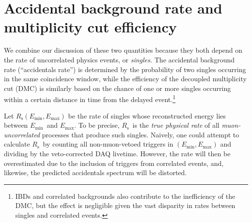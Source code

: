 \documentclass[../thesis.tex]{subfiles}
\begin{document}
\chapter{Accidental background rate and multiplicity cut efficiency}
\label{chap:accDMC}


\def\Emin{\ensuremath{E_\mathrm{min}}} \def\Emax{\ensuremath{E_\mathrm{max}}}
\def\Rs{\ensuremath{R_\mathrm{s}}} \def\Rplu{\ensuremath{R_\mathrm{+}}}
\def\Rpro{\ensuremath{R_\mathrm{p}}} \def\Rdel{\ensuremath{R_\mathrm{d}}}
\def\Rsub{\ensuremath{R_\mathrm{\lambda}}} \def\Nplu{\ensuremath{N_\mathrm{+}}}
\def\Npro{\ensuremath{N_\mathrm{p}}} \def\Ndel{\ensuremath{N_\mathrm{d}}}
\def\eisol{\ensuremath{\epsilon_\mathrm{i}}}
\def\emu{\ensuremath{\epsilon_\mathrm{\mu}}}
\def\etot{\ensuremath{\epsilon_\mathrm{tot}}}
\def\Racc{\ensuremath{R_\mathrm{acc}}}

We combine our discussion of these two quantities because they both depend on the rate of uncorrelated physics events, or \emph{singles.} The accidental background rate (``accidentals rate'') is determined by the probability of two singles occurring in the same coincidence window, while the efficiency of the decoupled multiplicity cut (DMC) is similarly based on the chance of one or more singles occurring within a certain distance in time from the delayed event.\footnote{IBDs and correlated backgrounds also contribute to the inefficiency of the DMC, but the effect is negligible given the vast disparity in rates between singles and correlated events.}

Let $\Rs(\Emin, \Emax)$ be the rate of singles whose reconstructed energy lies
between \Emin\ and \Emax. To be precise, \Rs\ is the \emph{true physical rate}
of all \emph{muon-uncorrelated} processes that produce such singles. Naively,
one could attempt to calculate \Rs\ by counting all non-muon-vetoed triggers in
$(\Emin, \Emax)$ and dividing by the veto-corrected DAQ livetime. However, the
rate will then be overestimated due to the inclusion of triggers from correlated
events, and, likewise, the predicted accidentals spectrum will be distorted.
\end{document}

